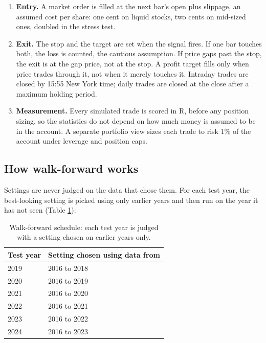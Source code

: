 \documentclass[11pt,a4paper]{article}
\providecommand{\tightlist}{\setlength{\itemsep}{0pt}\setlength{\parskip}{0pt}}
\begin{document}
\begin{enumerate}
\def\labelenumi{\arabic{enumi}.}
\tightlist
\item
  \textbf{Entry.} A market order is filled at the next bar's open plus slippage, an assumed cost per share: one cent on liquid
  stocks, two cents on mid-sized ones, doubled in the stress test.
\item
  \textbf{Exit.} The stop and the target are set when the signal fires. If one bar touches both, the loss is counted, the cautious
  assumption. If price gaps past the stop, the exit is at the gap price, not at the stop. A profit target fills only when
  price trades through it, not when it merely touches it. Intraday trades are closed by 15:55 New York time; daily trades
  are closed at the close after a maximum holding period.
\item
  \textbf{Measurement.} Every simulated trade is scored in R, before any position sizing, so the statistics do not depend on how
  much money is assumed to be in the account. A separate portfolio view sizes each trade to risk 1\% of the account under
  leverage and position caps.
\end{enumerate}

\subsection{How walk-forward works}\label{how-walk-forward-works}

Settings are never judged on the data that chose them. For each test year, the best-looking setting is picked using only
earlier years and then run on the year it has not seen (Table \ref{tbl:walkforward}):

\begin{table}[tbp]
\centering
\caption{Walk-forward schedule: each test year is judged with a setting chosen on earlier years only.}\label{tbl:walkforward}
\begin{tabular}{@{}ll@{}}
\toprule
Test year & Setting chosen using data from \\
\midrule
2019 & 2016 to 2018 \\
2020 & 2016 to 2019 \\
2021 & 2016 to 2020 \\
2022 & 2016 to 2021 \\
2023 & 2016 to 2022 \\
2024 & 2016 to 2023 \\
\bottomrule
\end{tabular}
\end{table}
\end{document}
